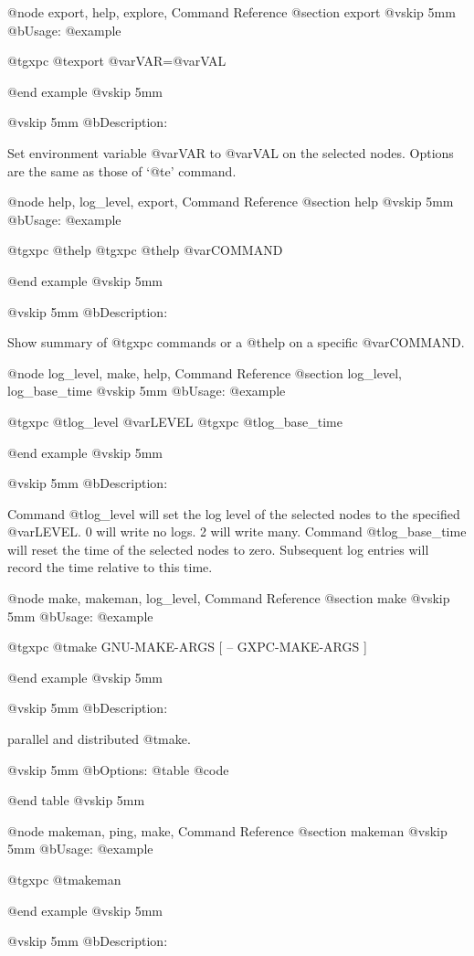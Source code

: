 @node export, help, explore, Command Reference
@section export
@vskip 5mm
@b{Usage:}
@example

  @t{gxpc} @t{export} @var{VAR}=@var{VAL}

@end example
@vskip 5mm

@vskip 5mm
@b{Description:}


  Set environment variable @var{VAR} to @var{VAL} on the selected nodes.
Options are the same as those of `@t{e}' command.

@node help, log_level, export, Command Reference
@section help
@vskip 5mm
@b{Usage:}
@example

  @t{gxpc} @t{help}
  @t{gxpc} @t{help} @var{COMMAND}

@end example
@vskip 5mm

@vskip 5mm
@b{Description:}


  Show summary of @t{gxpc} commands or a @t{help} on a specific @var{COMMAND}.

@node log_level, make, help, Command Reference
@section log_level, log_base_time
@vskip 5mm
@b{Usage:}
@example

  @t{gxpc} @t{log_level} @var{LEVEL}
  @t{gxpc} @t{log_base_time}

@end example
@vskip 5mm

@vskip 5mm
@b{Description:}


  Command @t{log_level} will set the log level of the selected nodes
to the specified @var{LEVEL}.  0 will write no logs. 2 will write many.
Command @t{log_base_time} will reset the time of the selected nodes
to zero.  Subsequent log entries will record the time relative to
this time.

@node make, makeman, log_level, Command Reference
@section make
@vskip 5mm
@b{Usage:}
@example

  @t{gxpc} @t{make} GNU-MAKE-ARGS [ -- GXPC-MAKE-ARGS ]

@end example
@vskip 5mm

@vskip 5mm
@b{Description:}


  parallel and distributed @t{make}.

@vskip 5mm
@b{Options:}
@table @code


@end table
@vskip 5mm

@node makeman, ping, make, Command Reference
@section makeman
@vskip 5mm
@b{Usage:}
@example

  @t{gxpc} @t{makeman}

@end example
@vskip 5mm

@vskip 5mm
@b{Description:}


